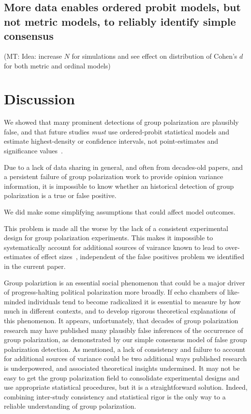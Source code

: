 \documentclass[11pt, letterpaper]{article}
\newcommand{\mt}[1]{{\textcolor{myorange} {({\tiny MT:} #1)}}}
\begin{document}
\subsection{More data enables ordered probit models, but not metric models, to reliably
  identify simple consensus}

  \mt{Idea: increase $N$ for simulations and see effect on distribution of Cohen's $d$
  for both metric and ordinal models}


\section{Discussion}

We showed that many prominent detections of group polarization are plausibly
false, and that future studies \emph{must} use ordered-probit statistical
models and estimate highest-density or confidence intervals, not point-estimates 
and significance values~\cite{Meehl1997}.

Due to a lack of data sharing in general, and often from decades-old papers, and a persistent 
failure of group polarization work to provide opinion variance information, 
it is impossible to know whether an historical detection of group polarization
is a true or false positive. 

We did make some simplifying assumptions that could affect model outcomes. 

This problem is made all the worse by the lack of a consistent experimental design for group
polarization experiments. This makes it impossible to systematically account for
additional sources of vairance known to lead to over-estimates
of effect sizes~\cite{Yarkoni2021}, independent of the false positives problem
we identified in the current paper. 


Group polariztion is an essential social phenomenon that could be a major driver of
progress-halting political polarization more broadly. If echo chambers of like-minded
individuals tend to become radicalized it is essential to measure by how much
in different contexts, and to develop rigorous theoretical explanations of
this phenomenon. It appears, unfortunately, that decades of group polarization
research may have published many plausibly false inferences of the
occurrence of group polarization, as demonstrated by our simple consensus
model of false group polarization detection. As mentioned, a lack of
consistency and failure to account for additional sources of variance could
be two additional ways published research is underpowered, and associated
theoretical insights undermined. It may not be easy to get the group polarization field to 
consolidate experimental designs and use appropriate statistical procedures,
but it is a straightforward solution. Indeed, combining inter-study consistency and statistical
rigor is the only way to a reliable understanding of group polarization.
\end{document}
